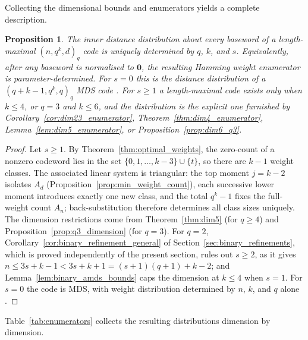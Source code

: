 \documentclass[12pt, letterpaper]{article}
\theoremstyle{plain}
\newtheorem{proposition}[theorem]{Proposition}
\theoremstyle{definition}
\begin{document}
	Collecting the dimensional bounds and enumerators yields a complete description.

	\begin{proposition}\label{prop:completeness}
		The inner distance distribution about every baseword of a length-maximal $(n,q^k,d)_q$ code is uniquely determined by $q$, $k$, and $s$. Equivalently, after any baseword is normalised to $\mathbf0$, the resulting Hamming weight enumerator is parameter-determined. For $s=0$ this is the distance distribution of a $(q+k-1,q^k,q)_q$ MDS code \cite{Alderson2020}. For $s\ge1$ a length-maximal code exists only when $k\le4$, or $q=3$ and $k\le6$, and the distribution is the explicit one furnished by Corollary~\ref{cor:dim23_enumerator}, Theorem~\ref{thm:dim4_enumerator}, Lemma~\ref{lem:dim5_enumerator}, or Proposition~\ref{prop:dim6_q3}.
	\end{proposition}

	\begin{proof}
		Let $s \ge 1$. By Theorem~\ref{thm:optimal_weights}, the zero-count of a nonzero codeword lies in the set $\{0,1,\dots,k-3\} \cup \{t\}$, so there are $k-1$ weight classes. The associated linear system is triangular: the top moment $j = k-2$ isolates $A_d$ (Proposition~\ref{prop:min_weight_count}), each successive lower moment introduces exactly one new class, and the total $q^k-1$ fixes the full-weight count $A_n$; back-substitution therefore determines all class sizes uniquely. The dimension restrictions come from Theorem~\ref{thm:dim5} (for $q \ge 4$) and Proposition~\ref{prop:q3_dimension} (for $q = 3$). For $q = 2$, Corollary~\ref{cor:binary_refinement_general} of Section~\ref{sec:binary_refinements}, which is proved independently of the present section, rules out $s \ge 2$, as it gives $n \le 3s+k-1 < 3s+k+1 = (s+1)(q+1)+k-2$; and Lemma~\ref{lem:binary_amds_bounds} caps the dimension at $k \le 4$ when $s = 1$. For $s = 0$ the code is MDS, with weight distribution determined by $n$, $k$, and $q$ alone \cite{Alderson2020}.
	\end{proof}

	Table~\ref{tab:enumerators} collects the resulting distributions dimension by dimension.
\end{document}

